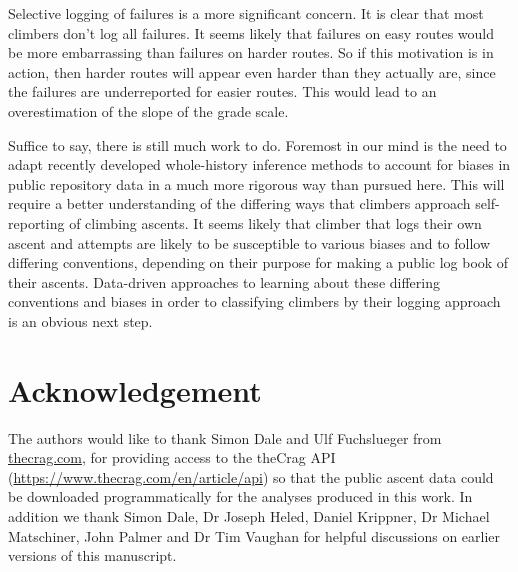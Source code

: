 \documentclass{article}
\begin{document}
Selective logging of failures is a more significant concern. It is clear that most climbers don't log all failures. It seems likely that failures on easy routes would be more embarrassing than failures on harder routes. So if this motivation is in action, then harder routes will appear even harder than they actually are, since the failures are underreported for easier routes. This would lead to an overestimation of the slope of the grade scale.

Suffice to say, there is still much work to do. Foremost in our mind is the need to adapt recently developed whole-history inference methods to account for biases in public repository data in a much more rigorous way than pursued here. This will require a better understanding of the differing ways that climbers approach self-reporting of climbing ascents. It seems likely that climber that logs their own ascent and attempts are likely to be susceptible to various biases and to follow differing conventions, depending on their purpose for making a public log book of their ascents. Data-driven approaches to learning about these differing conventions and biases in order to classifying climbers by their logging approach is an obvious next step.

\section*{Acknowledgement}

The authors would like to thank Simon Dale and Ulf Fuchslueger from \url{thecrag.com}, for providing access to the theCrag API (\url{https://www.thecrag.com/en/article/api}) so that the public ascent data could be downloaded programmatically for the analyses produced in this work. In addition we thank Simon Dale, Dr Joseph Heled, Daniel Krippner, Dr Michael Matschiner, John Palmer and Dr Tim Vaughan for helpful discussions on earlier versions of this manuscript.

\printglossaries



\end{document}
